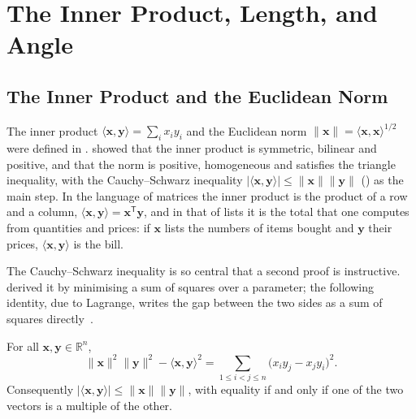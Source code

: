 \section{The Inner Product, Length, and Angle}
\label{sec:inner-product-length}

\subsection{The Inner Product and the Euclidean Norm}

The inner product $\langle\mathbf x,\mathbf y\rangle=\sum_ix_iy_i$ and the Euclidean norm $\|\mathbf x\|=\langle\mathbf x,\mathbf x\rangle^{1/2}$ were defined in .  showed that the inner product is symmetric, bilinear and positive, and  that the norm is positive, homogeneous and satisfies the triangle inequality, with the Cauchy--Schwarz inequality $|\langle\mathbf x,\mathbf y\rangle|\le\|\mathbf x\|\|\mathbf y\|$ () as the main step. In the language of matrices the inner product is the product of a row and a column, $\langle\mathbf x,\mathbf y\rangle=\mathbf x^{\mathsf T}\mathbf y$, and in that of lists it is the total that one computes from quantities and prices: if $\mathbf x$ lists the numbers of items bought and $\mathbf y$ their prices, $\langle\mathbf x,\mathbf y\rangle$ is the bill.

The Cauchy--Schwarz inequality is so central that a second proof is instructive.  derived it by minimising a sum of squares over a parameter; the following identity, due to Lagrange, writes the gap between the two sides as a sum of squares directly~\cite[Chap.~1]{steele2004}.

\begin{proposition}
\label{prop:lagrange-identity}
For all $\mathbf x,\mathbf y\in\mathbb R^n$,
\[
\|\mathbf x\|^2\|\mathbf y\|^2-\langle\mathbf x,\mathbf y\rangle^2=\sum_{1\le i<j\le n}\bigl(x_iy_j-x_jy_i\bigr)^2 .
\]
Consequently $|\langle\mathbf x,\mathbf y\rangle|\le\|\mathbf x\|\|\mathbf y\|$, with equality if and only if one of the two vectors is a multiple of the other.
\end{proposition}

